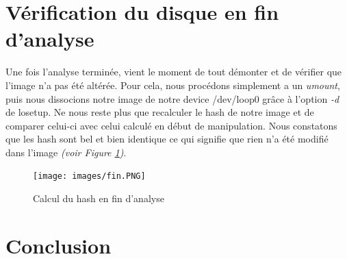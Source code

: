 \documentclass[a4paper]{article}
\begin{document}














\section{Vérification du disque en fin d'analyse}

Une fois l'analyse terminée, vient le moment de tout démonter et de vérifier que l'image n'a pas été altérée. Pour cela, nous procédons simplement a un \emph{umount}, puis nous dissocions notre image de notre device /dev/loop0 grâce à l'option \emph{-d} de losetup. Ne nous reste plus que recalculer le hash de notre image et de comparer celui-ci avec celui calculé en début de manipulation. Nous constatons que les hash sont bel et bien identique ce qui signifie que rien n'a été modifié dans l'image \emph{(voir Figure \ref{hash_ending})}.

\begin{figure}[H]
    \centering
    \texttt{[image: images/fin.PNG]}
    \caption{Calcul du hash en fin d'analyse}
    \label{hash_ending}
\end{figure}


















\newpage
\section{Conclusion}





\end{document}
